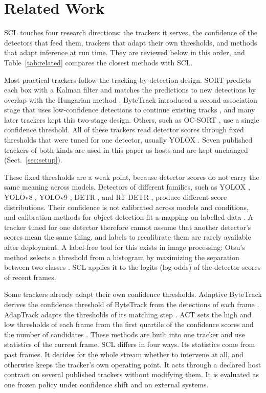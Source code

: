 \documentclass[pdflatex,sn-mathphys-num,iicol]{sn-jnl}
\newcommand{\scl}{SCL}
\begin{document}
\section{Related Work}\label{sec:related}

\scl{} touches four research directions: the trackers it serves, the
confidence of the detectors that feed them, trackers that adapt their own
thresholds, and methods that adapt inference at run time. They are reviewed
below in this order, and Table~\ref{tab:related} compares the closest
methods with \scl{}.

Most practical trackers follow the tracking-by-detection design. SORT
predicts each box with a Kalman filter and matches the predictions to new
detections by overlap with the Hungarian method \cite{bewley2016sort}.
ByteTrack introduced a second association stage that uses low-confidence
detections to continue existing tracks \cite{zhang2022bytetrack}, and many
later trackers kept this two-stage design. Others, such as OC-SORT
\cite{cao2023ocsort}, use a single confidence threshold. All of these
trackers read detector scores through fixed thresholds that were tuned for
one detector, usually YOLOX \cite{ge2021yolox}. Seven published trackers of
both kinds are used in this paper as hosts and are kept unchanged
(Sect.~\ref{sec:setup}).

These fixed thresholds are a weak point, because detector scores do not
carry the same meaning across models. Detectors of different families, such
as YOLOX \cite{ge2021yolox}, YOLOv8 \cite{jocher2023yolov8}, YOLOv9
\cite{wang2024yolov9}, DETR \cite{carion2020detr}, and RT-DETR
\cite{zhao2024rtdetr}, produce different score distributions. Their
confidence is not calibrated across models and conditions, and calibration
methods for object detection fit a mapping on labelled data
\cite{kuppers2020detcalib}. A tracker tuned for one detector therefore
cannot assume that another detector's scores mean the same thing, and labels
to recalibrate them are rarely available after deployment. A label-free tool
for this exists in image processing: Otsu's method selects a threshold from
a histogram by maximizing the separation between two classes
\cite{otsu1979}. \scl{} applies it to the logits (log-odds) of the detector
scores of recent frames.

Some trackers already adapt their own confidence thresholds. Adaptive
ByteTrack derives the confidence threshold of ByteTrack from the detections
of each frame \cite{ma2023adaptivebytetrack}. AdapTrack adapts the
thresholds of its matching step \cite{shim2024adaptrack}. ACT sets the high
and low thresholds of each frame from the first quartile of the confidence
scores and the number of candidates \cite{act2026adaptive}. These methods
are built into one tracker and use statistics of the current frame. \scl{}
differs in four ways. Its statistics come from past frames. It decides for
the whole stream whether to intervene at all, and otherwise keeps the
tracker's own operating point. It acts through a declared host contract on
several published trackers without modifying them. It is evaluated as one
frozen policy under confidence shift and on external systems.
\end{document}

